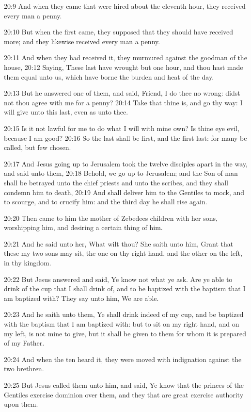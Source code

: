 20:9 And when they came that were hired about the eleventh hour, they received every man a penny.

20:10 But when the first came, they supposed that they should have received more; and they likewise received every man a penny.

20:11 And when they had received it, they murmured against the goodman of the house, 20:12 Saying, These last have wrought but one hour, and thou hast made them equal unto us, which have borne the burden and heat of the day.

20:13 But he answered one of them, and said, Friend, I do thee no wrong: didst not thou agree with me for a penny?  20:14 Take that thine is, and go thy way: I will give unto this last, even as unto thee.

20:15 Is it not lawful for me to do what I will with mine own? Is thine eye evil, because I am good?  20:16 So the last shall be first, and the first last: for many be called, but few chosen.

20:17 And Jesus going up to Jerusalem took the twelve disciples apart in the way, and said unto them, 20:18 Behold, we go up to Jerusalem; and the Son of man shall be betrayed unto the chief priests and unto the scribes, and they shall condemn him to death, 20:19 And shall deliver him to the Gentiles to mock, and to scourge, and to crucify him: and the third day he shall rise again.

20:20 Then came to him the mother of Zebedees children with her sons, worshipping him, and desiring a certain thing of him.

20:21 And he said unto her, What wilt thou? She saith unto him, Grant that these my two sons may sit, the one on thy right hand, and the other on the left, in thy kingdom.

20:22 But Jesus answered and said, Ye know not what ye ask. Are ye able to drink of the cup that I shall drink of, and to be baptized with the baptism that I am baptized with? They say unto him, We are able.

20:23 And he saith unto them, Ye shall drink indeed of my cup, and be baptized with the baptism that I am baptized with: but to sit on my right hand, and on my left, is not mine to give, but it shall be given to them for whom it is prepared of my Father.

20:24 And when the ten heard it, they were moved with indignation against the two brethren.

20:25 But Jesus called them unto him, and said, Ye know that the princes of the Gentiles exercise dominion over them, and they that are great exercise authority upon them.


